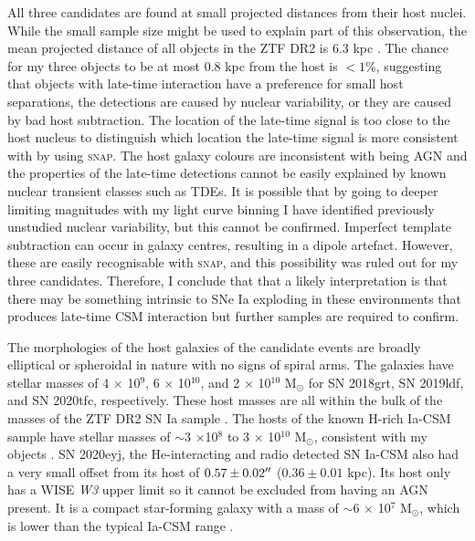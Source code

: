 \documentclass[a4paper,oneside,12pt, class=Latex/Classes/PhDthesisPSnPDF, crop=false]{standalone}
\begin{document}
All three candidates are found at small projected distances from their host nuclei. While the small sample size might be used to explain part of this observation, the mean projected distance of all objects in the ZTF DR2 is 6.3 kpc \citep{DR2_Overview}. The chance for my three objects to be at most 0.8 kpc from the host is $<1$\%, suggesting that objects with late-time interaction have a preference for small host separations, the detections are caused by nuclear variability, or they are caused by bad host subtraction. The location of the late-time signal is too close to the host nucleus to distinguish which location the late-time signal is more consistent with by using \textsc{snap}. The host galaxy colours are inconsistent with being AGN and the properties of the late-time detections cannot be easily explained by known nuclear transient classes such as TDEs. It is possible that by going to deeper limiting magnitudes with my light curve binning I have identified previously unstudied nuclear variability, but this cannot be confirmed. Imperfect template subtraction can occur in galaxy centres, resulting in a dipole artefact. However, these are easily recognisable with \textsc{snap}, and this possibility was ruled out for my three candidates. Therefore, I conclude that that a likely interpretation is that there may be something intrinsic to SNe Ia exploding in these environments that produces late-time CSM interaction but further samples are required to confirm.

The morphologies of the host galaxies of the candidate events are broadly elliptical or spheroidal in nature with no signs of spiral arms. The galaxies have stellar masses of 4 $\times$ 10$^9$, 6 $\times$ 10$^{10}$, and 2 $\times$ 10$^{10}$ M$_\odot$ for SN 2018grt, SN 2019ldf, and SN 2020tfc, respectively. These host masses are all within the bulk of the masses of the ZTF DR2 SN Ia sample \citep{DR2_Overview}. The hosts of the known H-rich Ia-CSM sample have stellar masses of $\sim$3 $\times$10$^8$ to 3 $\times$ 10$^{10}$ M$_\odot$, consistent with my objects \citep{Ia-CSM_BTS}. SN 2020eyj, the He-interacting and radio detected SN Ia-CSM \citep{Kool_He_CSM} also had a very small offset from its host of $0.57\pm0.02^{\prime\prime}$ ($0.36\pm0.01$ kpc). Its host only has a WISE \textit{W3} upper limit so it cannot be excluded from having an AGN present. It is a compact star-forming galaxy with a mass of $\sim$6 $\times$ 10$^7$ M$_\odot$, which is lower than the typical Ia-CSM range \citep{Ia-CSM_BTS}.
\end{document}
